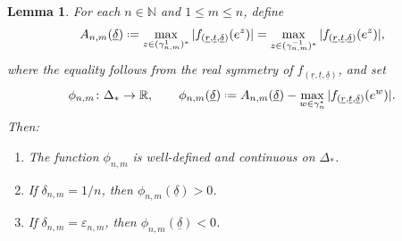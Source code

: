 \documentclass[a4paper, 11pt, reqno]{amsart}
\numberwithin{equation}{section}
\theoremstyle{plain}
\newtheorem{lemma}[theorem]{Lemma}
\newcommand*{\defeq}{\mathrel{\vcenter{\baselineskip0.5ex \lineskiplimit0pt
 \hbox{\scriptsize.}\hbox{\scriptsize.}}}=}
\theoremstyle{remark}
\newcommand{\R}{{\mathbb{R}}}
\newcommand{\N}{{\mathbb{N}}}
\newcommand{\uldelta}{\underline{\delta}}
\newcommand{\ulr}{\underline{r}}
\newcommand{\ult}{\underline{t}}
\begin{document}
\begin{lemma}
	\label{lem:finite_shooting}
	For each \(n\in\N\) and \(1\leq m\leq n\), define
	\[
	A_{n,m}(\uldelta)
	\defeq
	\max_{z\in(\gamma^1_{n,m})^*}|f_{(\ulr,\ult,\uldelta)}(e^z)|
	=
	\max_{z\in(\gamma^{-1}_{n,m})^*}|f_{(\ulr,\ult,\uldelta)}(e^z)|,
	\]
	where the equality follows from the real symmetry of \(f_{(\ulr,\ult,\uldelta)}\), and set
	\[
	\phi_{n,m}\colon\Delta_*\to\R,
	\qquad
	\phi_{n,m}(\uldelta)\defeq
	A_{n,m}(\uldelta)
	-
	\max_{w\in\gamma_n^*}|f_{(\ulr,\ult,\uldelta)}(e^w)|.
	\]
	Then:
	\begin{enumerate}
		\item The function \(\phi_{n,m}\) is well-defined and continuous on \(\Delta_*\).
		\item If \(\delta_{n,m}=1/n\), then \(\phi_{n,m}(\uldelta)>0\).
		\item If \(\delta_{n,m}=\varepsilon_{n,m}\), then \(\phi_{n,m}(\uldelta)<0\).
	\end{enumerate}
\end{lemma}
\end{document}
